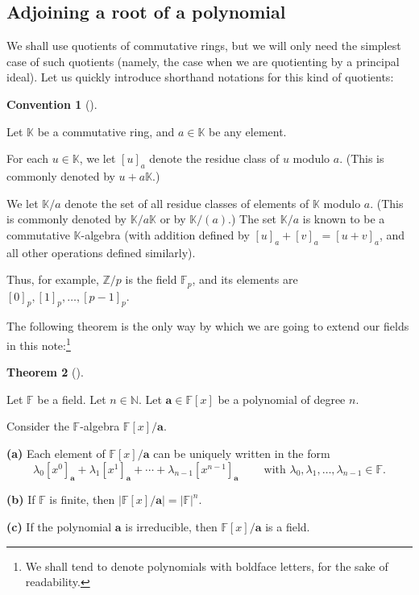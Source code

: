 \documentclass[numbers=enddot,12pt,final,onecolumn,notitlepage]{scrartcl}%
\theoremstyle{definition}
\newtheorem{theo}{Theorem}[subsection]
\newenvironment{theorem}[1][]
{\begin{theo}[#1]\begin{leftbar}}
{\end{leftbar}\end{theo}}
\newtheorem{conv}[theo]{Convention}
\newenvironment{convention}[1][]
{\begin{conv}[#1]\begin{leftbar}}
{\end{leftbar}\end{conv}}
\begin{document}
\subsection{Adjoining a root of a polynomial}

We shall use quotients of commutative rings, but we will only need the
simplest case of such quotients (namely, the case when we are quotienting by a
principal ideal). Let us quickly introduce shorthand notations for this kind
of quotients:

\begin{convention}
\label{conv.quotient}Let $\mathbb{K}$ be a commutative ring, and
$a\in\mathbb{K}$ be any element.

For each $u\in\mathbb{K}$, we let $\left[  u\right]  _{a}$ denote the residue
class of $u$ modulo $a$. (This is commonly denoted by $u+a\mathbb{K}$.)

We let $\mathbb{K}/a$ denote the set of all residue classes of elements of
$\mathbb{K}$ modulo $a$. (This is commonly denoted by $\mathbb{K}/a\mathbb{K}$
or by $\mathbb{K}/\left(  a\right)  $.) The set $\mathbb{K}/a$ is known to be
a commutative $\mathbb{K}$-algebra (with addition defined by $\left[
u\right]  _{a}+\left[  v\right]  _{a}=\left[  u+v\right]  _{a}$, and all other
operations defined similarly).
\end{convention}

Thus, for example, $\mathbb{Z}/p$ is the field $\mathbb{F}_{p}$, and its
elements are $\left[  0\right]  _{p},\left[  1\right]  _{p},\ldots,\left[
p-1\right]  _{p}$.

The following theorem is the only way by which we are going to extend our
fields in this note:\footnote{We shall tend to denote polynomials with
boldface letters, for the sake of readability.}

\begin{theorem}
\label{thm.field-ext}Let $\mathbb{F}$ be a field. Let $n\in\mathbb{N}$. Let
$\mathbf{a}\in\mathbb{F}\left[  x\right]  $ be a polynomial of degree $n$.

Consider the $\mathbb{F}$-algebra $\mathbb{F}\left[  x\right]  /\mathbf{a}$.

\textbf{(a)} Each element of $\mathbb{F}\left[  x\right]  /\mathbf{a}$ can be
uniquely written in the form%
\[
\lambda_{0}\left[  x^{0}\right]  _{\mathbf{a}}+\lambda_{1}\left[
x^{1}\right]  _{\mathbf{a}}+\cdots+\lambda_{n-1}\left[  x^{n-1}\right]
_{\mathbf{a}}\ \ \ \ \ \ \ \ \ \ \text{with }\lambda_{0},\lambda_{1}%
,\ldots,\lambda_{n-1}\in\mathbb{F}.
\]


\textbf{(b)} If $\mathbb{F}$ is finite, then $\left\vert \mathbb{F}\left[
x\right]  /\mathbf{a}\right\vert =\left\vert \mathbb{F}\right\vert ^{n}$.

\textbf{(c)} If the polynomial $\mathbf{a}$ is irreducible, then
$\mathbb{F}\left[  x\right]  /\mathbf{a}$ is a field.
\end{theorem}
\end{document}
